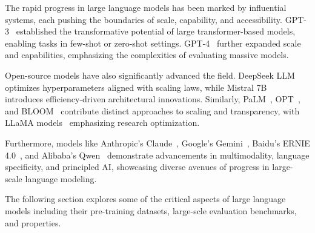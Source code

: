 The rapid progress in large language models has been marked by influential systems, each pushing the boundaries of scale, capability, and accessibility. GPT-3~\citep{brown2020gpt3} established the transformative potential of large transformer-based models, enabling tasks in few-shot or zero-shot settings. GPT-4~\citep{openai2023gpt4} further expanded scale and capabilities, emphasizing the complexities of evaluating massive models.

Open-source models have also significantly advanced the field. DeepSeek LLM~\citep{deepseek2024llm} optimizes hyperparameters aligned with scaling laws, while Mistral 7B~\citep{jiang2023mistral} introduces efficiency-driven architectural innovations. Similarly, PaLM~\citep{chowdhery2023palm}, OPT~\citep{zhang2022opt}, and BLOOM~\citep{le2023bloom} contribute distinct approaches to scaling and transparency, with LLaMA models~\citep{touvron2023llama} emphasizing research optimization.

Furthermore, models like Anthropic's Claude~\citep{anthropic2024claude3,anthropic2024claude35,anthropic2025claude37}, Google's Gemini~\citep{deepmind2023gemini}, Baidu's ERNIE 4.0~\citep{baidu2023ernie4}, and Alibaba's Qwen~\citep{alibaba2023qwen} demonstrate advancements in multimodality, language specificity, and principled AI, showcasing diverse avenues of progress in large-scale language modeling.

The following section explores some of the critical aspects of large language models including their pre-training datasets, large-scle evaluation benchmarks, and properties.

